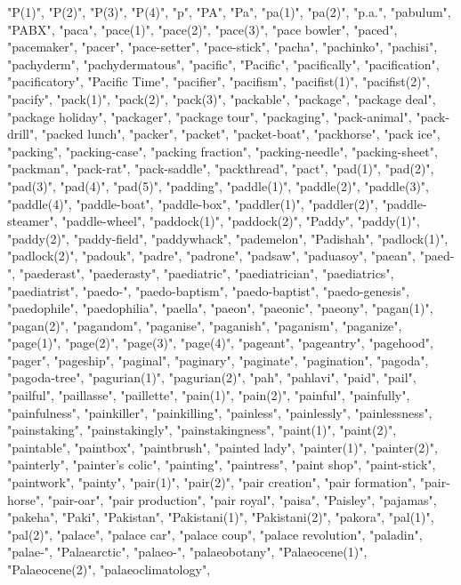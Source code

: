 "P(1)",
"P(2)",
"P(3)",
"P(4)",
"p",
"PA",
"Pa",
"pa(1)",
"pa(2)",
"p.a.",
"pabulum",
"PABX",
"paca",
"pace(1)",
"pace(2)",
"pace(3)",
"pace bowler",
"paced",
"pacemaker",
"pacer",
"pace-setter",
"pace-stick",
"pacha",
"pachinko",
"pachisi",
"pachyderm",
"pachydermatous",
"pacific",
"Pacific",
"pacifically",
"pacification",
"pacificatory",
"Pacific Time",
"pacifier",
"pacifism",
"pacifist(1)",
"pacifist(2)",
"pacify",
"pack(1)",
"pack(2)",
"pack(3)",
"packable",
"package",
"package deal",
"package holiday",
"packager",
"package tour",
"packaging",
"pack-animal",
"pack-drill",
"packed lunch",
"packer",
"packet",
"packet-boat",
"packhorse",
"pack ice",
"packing",
"packing-case",
"packing fraction",
"packing-needle",
"packing-sheet",
"packman",
"pack-rat",
"pack-saddle",
"packthread",
"pact",
"pad(1)",
"pad(2)",
"pad(3)",
"pad(4)",
"pad(5)",
"padding",
"paddle(1)",
"paddle(2)",
"paddle(3)",
"paddle(4)",
"paddle-boat",
"paddle-box",
"paddler(1)",
"paddler(2)",
"paddle-steamer",
"paddle-wheel",
"paddock(1)",
"paddock(2)",
"Paddy",
"paddy(1)",
"paddy(2)",
"paddy-field",
"paddywhack",
"pademelon",
"Padishah",
"padlock(1)",
"padlock(2)",
"padouk",
"padre",
"padrone",
"padsaw",
"paduasoy",
"paean",
"paed-",
"paederast",
"paederasty",
"paediatric",
"paediatrician",
"paediatrics",
"paediatrist",
"paedo-",
"paedo-baptism",
"paedo-baptist",
"paedo-genesis",
"paedophile",
"paedophilia",
"paella",
"paeon",
"paeonic",
"paeony",
"pagan(1)",
"pagan(2)",
"pagandom",
"paganise",
"paganish",
"paganism",
"paganize",
"page(1)",
"page(2)",
"page(3)",
"page(4)",
"pageant",
"pageantry",
"pagehood",
"pager",
"pageship",
"paginal",
"paginary",
"paginate",
"pagination",
"pagoda",
"pagoda-tree",
"pagurian(1)",
"pagurian(2)",
"pah",
"pahlavi",
"paid",
"pail",
"pailful",
"paillasse",
"paillette",
"pain(1)",
"pain(2)",
"painful",
"painfully",
"painfulness",
"painkiller",
"painkilling",
"painless",
"painlessly",
"painlessness",
"painstaking",
"painstakingly",
"painstakingness",
"paint(1)",
"paint(2)",
"paintable",
"paintbox",
"paintbrush",
"painted lady",
"painter(1)",
"painter(2)",
"painterly",
"painter's colic",
"painting",
"paintress",
"paint shop",
"paint-stick",
"paintwork",
"painty",
"pair(1)",
"pair(2)",
"pair creation",
"pair formation",
"pair-horse",
"pair-oar",
"pair production",
"pair royal",
"paisa",
"Paisley",
"pajamas",
"pakeha",
"Paki",
"Pakistan",
"Pakistani(1)",
"Pakistani(2)",
"pakora",
"pal(1)",
"pal(2)",
"palace",
"palace car",
"palace coup",
"palace revolution",
"paladin",
"palae-",
"Palaearctic",
"palaeo-",
"palaeobotany",
"Palaeocene(1)",
"Palaeocene(2)",
"palaeoclimatology",
